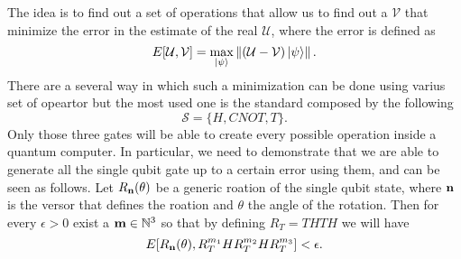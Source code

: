 The idea is to find out a set of operations that allow us to find out a $\mathcal{V}$ that minimize the error in the estimate of the real $\mathcal{U}$, where the error is defined as
\begin{equation}
    E[\mathcal{U}, \mathcal{V}] = \max_{\ket{\psi}}\left\lVert \left( \mathcal{U} - \mathcal{V} \right)\ket{\psi} \right\rVert. 
\end{equation}
There are a several way in which such a minimization can be done using varius set of opeartor but the most used one is the standard composed by the following
\begin{equation}
    \mathcal{S} = \{H, CNOT, T\}.
\end{equation}
Only those three gates will be able to create every possible operation inside a quantum computer. In particular, we need to demonstrate that we are able to generate all the single qubit gate up to a certain error using them, and can be seen as follows.
{
    Let $R_{\vb{n}}(\theta)$ be a generic roation of the single qubit state, where $\vb{n}$ is the versor that defines the roation and $\theta$ the angle of the rotation. Then for every $\epsilon > 0$ exist a $\vb{m} \in \mathbb{N}^3$ so that by defining $R_T = THTH$ we will have
    \begin{equation}
        E[R_{\vb{n}}(\theta), R_T^{m_1} HR_T^{m_2}H R_T^{m_3}] < \epsilon.
    \end{equation}
}

